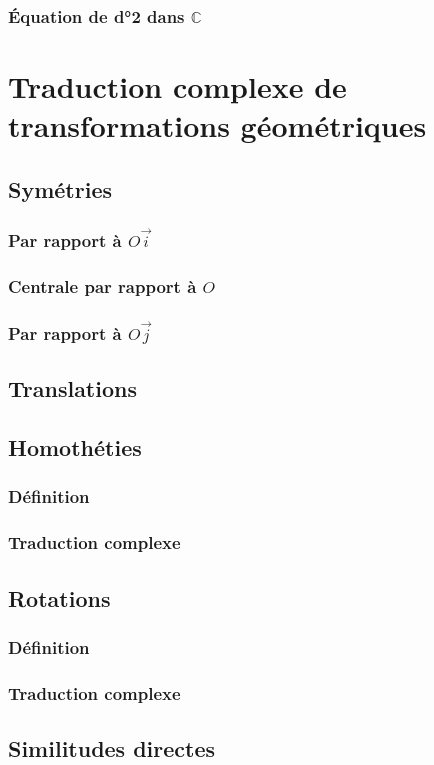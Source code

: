 \documentclass[12pt,a4paper,french]{book}
\begin{document}
			\subsubsection{Équation de d°2 dans $\mathbb{C}$}
	\section{Traduction complexe de transformations géométriques}
		\subsection{Symétries}
			\subsubsection{Par rapport à $O\overrightarrow{i}$}
			\subsubsection{Centrale par rapport à $O$}
			\subsubsection{Par rapport à $O\overrightarrow{j}$}
		\subsection{Translations}
		\subsection{Homothéties}
			\subsubsection{Définition}
			\subsubsection{Traduction complexe}
		\subsection{Rotations}
			\subsubsection{Définition}
			\subsubsection{Traduction complexe}
		\subsection{Similitudes directes}
\end{document}
